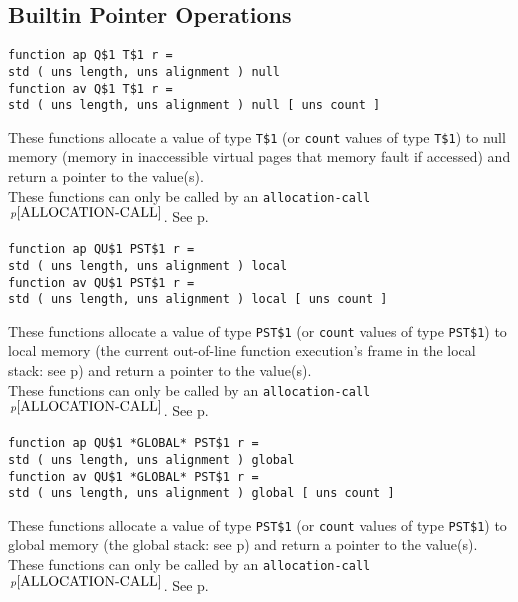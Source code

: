 \documentclass[12pt]{article}
\newcommand{\pagref}[1]{p\pageref{#1}}
\newcommand{\pagnote}[1]{$\,^{p\pageref{#1}}$}
\newenvironment{indpar}[1][0.3in]%
	{\begin{list}{}%
		     {\setlength{\itemsep}{0in}%
		      \setlength{\topsep}{0in}%
		      \setlength{\parsep}{1ex}%
		      \setlength{\labelwidth}{#1}%
		      \setlength{\leftmargin}{#1}%
		      \addtolength{\leftmargin}{\labelsep}}%
	 \item}%
	{\end{list}}
\begin{document}
\subsection{Builtin Pointer Operations}
\label{BUILTIN-POINTER-OPERATIONS}

{\tt function ap Q\$1  T\$1 r = \\
\hspace*{1in}std ( uns length, uns alignment ) null}%
\label{NULL} \\
{\tt function av Q\$1  T\$1 r = \\
\hspace*{1in}std ( uns length, uns alignment ) null [ uns count ]}
\begin{indpar}
These functions allocate a value of type {\tt T\$1}
(or {\tt count} values of type {\tt T\$1}) to null
memory (memory in inaccessible virtual pages that memory fault if
accessed)
and return a pointer to the value(s).
\\[1ex]
These functions can only be called by an
{\tt allocation-call}\pagnote{ALLOCATION-CALL}.
See \pagref{ALLOCATION-CALLS}.
\end{indpar}

{\tt function ap QU\$1  PST\$1 r = \\
\hspace*{1in}std ( uns length, uns alignment ) local}%
\label{LOCAL} \\
{\tt function av QU\$1  PST\$1 r = \\
\hspace*{1in}std ( uns length, uns alignment ) local [ uns count ]}
\begin{indpar}
These functions allocate a value of type {\tt PST\$1}
(or {\tt count} values of type {\tt PST\$1}) to local
memory (the current out-of-line function execution's frame in the local stack:
see \pagref{OUT-OF-LINE-LOCALS})
and return a pointer to the value(s).
\\[1ex]
These functions can only be called by an
{\tt allocation-call}\pagnote{ALLOCATION-CALL}.
See \pagref{ALLOCATION-CALLS}.
\end{indpar}

{\tt function ap QU\$1 *GLOBAL* PST\$1 r = \\
\hspace*{1in}std ( uns length, uns alignment ) global}%
\label{GLOBAL} \\
{\tt function av QU\$1 *GLOBAL* PST\$1 r = \\
\hspace*{1in}std ( uns length, uns alignment ) global [ uns count ]}
\begin{indpar}
These functions allocate a value of type {\tt PST\$1}
(or {\tt count} values of type {\tt PST\$1}) to global
memory (the global stack: see \pagref{GLOBAL-MEMORY})
and return a pointer to the value(s).
\\[1ex]
These functions can only be called by an
{\tt allocation-call}\pagnote{ALLOCATION-CALL}.
See \pagref{ALLOCATION-CALLS}.
\end{indpar}
\end{document}
